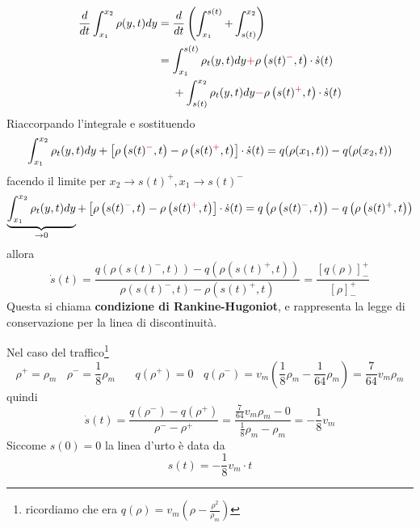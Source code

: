 \documentclass[10pt,a4paper,twoside,openright]{book}
\begin{document}
\begin{align*}
	\frac{d}{dt}\int ^{x_{2}}_{x_{1}} \rho ( y,t) dy & =\frac{d}{dt}\left(\int ^{s( t)}_{x_{1}} +\int ^{x_{2}}_{s( t)}\right)                                                                                                  \\
	                                                 & =\int ^{s( t)}_{x_{1}} \rho _{t}( y,t) dy\textcolor[rgb]{0.82,0.01,0.11}{+} \rho \left( s( t)\textcolor[rgb]{0.82,0.01,0.11}{^{-}} ,t\right) \cdotp \dot{s}( t)         \\
	                                                 & \ \ \ \ +\int ^{x_{2}}_{s( t)} \rho _{t}( y,t) dy\textcolor[rgb]{0.82,0.01,0.11}{-} \rho \left( s( t)\textcolor[rgb]{0.82,0.01,0.11}{^{+}} ,t\right) \cdotp \dot{s}( t) 
\end{align*}
Riaccorpando l'integrale e sostituendo
\begin{equation*}
	\int ^{x_{2}}_{x_{1}} \rho _{t}( y,t) dy+\left[ \rho \left( s( t)\textcolor[rgb]{0.82,0.01,0.11}{^{-}} ,t\right) -\rho \left( s( t)\textcolor[rgb]{0.82,0.01,0.11}{^{+}} ,t\right)\right] \cdotp \dot{s}( t) =q( \rho ( x_{1} ,t)) -q( \rho ( x_{2} ,t))
\end{equation*}
facendo il limite per $x_{2}\rightarrow s( t)^{+} ,x_{1}\rightarrow s( t)^{-}$
\begin{equation*}
	\underbrace{\int ^{x_{2}}_{x_{1}} \rho _{t}( y,t) dy}_{\rightarrow 0} +\left[ \rho \left( s( t)\textcolor[rgb]{0.82,0.01,0.11}{^{-}} ,t\right) -\rho \left( s( t)\textcolor[rgb]{0.82,0.01,0.11}{^{+}} ,t\right)\right] \cdotp \dot{s}( t) =q\left( \rho \left( s( t)^{-} ,t\right)\right) -q\left( \rho \left( s( t)^{+} ,t\right)\right)
\end{equation*}
allora
\begin{equation}
	\dot{s}( t) =\frac{q\left( \rho \left( s( t)^{-} ,t\right)\right) -q\left( \rho \left( s( t)^{+} ,t\right)\right)}{\rho \left( s( t)^{-} ,t\right) -\rho \left( s( t)^{+} ,t\right)} =\frac{[ q( \rho )]^{+}_{-}}{[ \rho ]^{+}_{-}}
\end{equation}
Questa si chiama \textbf{condizione di Rankine-Hugoniot}, e rappresenta la legge di conservazione per la linea di discontinuità.

Nel caso del traffico\footnote{ricordiamo che era $q( \rho ) =v_{m}\left( \rho -\frac{\rho ^{2}}{\rho _{m}}\right)$}
\begin{equation*}
	\rho ^{+} =\rho _{m} \ \ \ \ \rho ^{-} =\frac{1}{8} \rho _{m} \ \ \ \ \ \ \ \ q\left( \rho ^{+}\right) =0\ \ \ \ q\left( \rho ^{-}\right) =v_{m}\left(\frac{1}{8} \rho _{m} -\frac{1}{64} \rho _{m}\right) =\frac{7}{64} v_{m} \rho _{m}
\end{equation*}
quindi
\begin{equation*}
	\dot{s}( t) =\frac{q\left( \rho ^{-}\right) -q\left( \rho ^{+}\right)}{\rho ^{-} -\rho ^{+}} =\frac{\frac{7}{64} v_{m} \rho _{m} -0}{\frac{1}{8} \rho _{m} -\rho _{m}} =-\frac{1}{8} v_{m}
\end{equation*}
Siccome $s( 0) =0$ la linea d'urto è data da
\begin{equation*}
	s( t) =-\frac{1}{8} v_{m} \cdotp t
\end{equation*}
\end{document}
